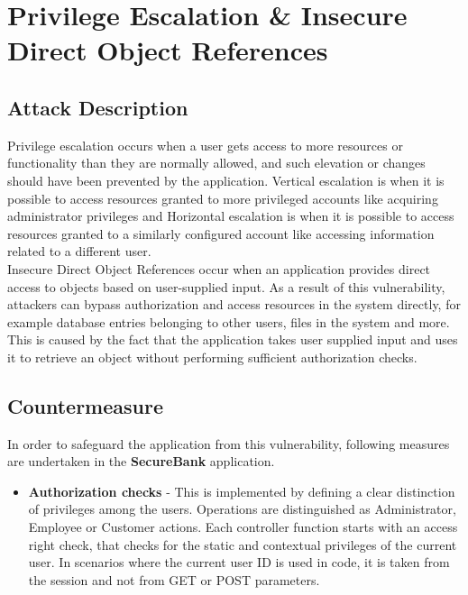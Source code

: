 \section{Privilege Escalation \& Insecure Direct Object References}

\subsection{Attack Description}
Privilege escalation occurs when a user gets access to more resources or functionality than they are normally allowed, and such elevation or changes should have been prevented by the application. Vertical escalation is when it is possible to access resources granted to more privileged accounts like acquiring administrator privileges and Horizontal escalation is when it is possible to access resources granted to a similarly configured account like accessing information related to a different user. \\

Insecure Direct Object References occur when an application provides direct access to objects based on user-supplied input. As a result of this vulnerability, attackers can bypass authorization and access resources in the system directly, for example database entries belonging to other users, files in the system and more. This is caused by the fact that the application takes user supplied input and uses it to retrieve an object without performing sufficient authorization checks.

\subsection{Countermeasure}
In order to safeguard the application from this vulnerability, following measures are undertaken in the \textbf{SecureBank} application.
\begin{itemize}
\item \textbf{Authorization checks} - This is implemented by defining a clear distinction of privileges among the users. Operations are distinguished as Administrator, Employee or Customer actions. Each controller function starts with an access right check, that checks for the static and contextual privileges of the current user. In scenarios where the current user ID is used in code, it is taken from the session and not from GET or POST parameters. 
\end{itemize}

\clearpage
